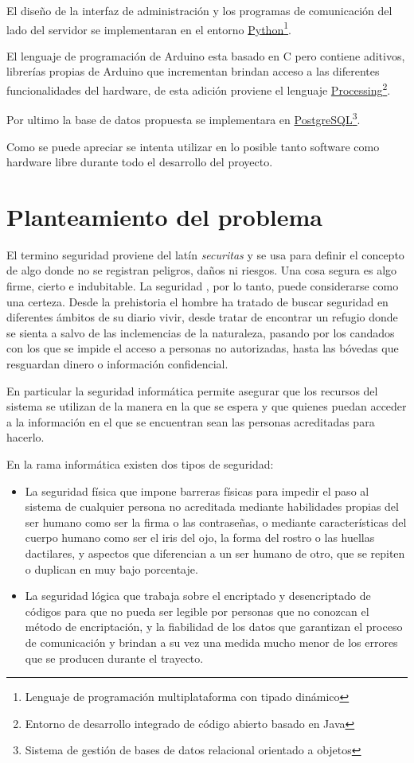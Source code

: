 \documentclass[12pt, letterpaper]{scrartcl}
\begin{document}
	El diseño de la interfaz de administración y los programas de comunicación del lado del servidor se implementaran en el entorno \href{https://www.python.org/}{Python}\footnote{Lenguaje de programación multiplataforma con tipado dinámico}.
	
	El lenguaje de programación de Arduino esta basado en C pero contiene aditivos, librerías propias de Arduino que incrementan brindan acceso a las diferentes funcionalidades del hardware, de esta adición proviene el lenguaje \href{https://processing.org/}{Processing}\footnote{Entorno de desarrollo integrado de código abierto basado en Java}.
	
	Por ultimo la base de datos propuesta se implementara en \href{http://www.postgresql.org/}{PostgreSQL}\footnote{Sistema de gestión de bases de datos relacional orientado a objetos}.
	
	Como se puede apreciar se intenta utilizar en lo posible tanto software como hardware libre durante todo el desarrollo del proyecto.
	
	\section{Planteamiento del problema}
	El termino seguridad proviene del latín \textit{securitas} y se usa para definir el concepto de algo donde no se registran peligros, daños ni riesgos. Una cosa segura es algo firme, cierto e indubitable. La seguridad , por lo tanto, puede considerarse como una certeza. Desde la prehistoria el hombre ha tratado de buscar seguridad en diferentes ámbitos de su diario vivir, desde tratar de encontrar un refugio donde se sienta a salvo de las inclemencias de la naturaleza, pasando por los candados con los que se impide el acceso a personas no autorizadas, hasta las bóvedas que resguardan dinero o información confidencial.
	
	En particular la seguridad informática permite asegurar que los recursos del sistema se utilizan de la manera en la que se espera y que quienes puedan acceder a la información en el que se encuentran sean las personas acreditadas para hacerlo.
	
	En la rama informática existen dos tipos de seguridad:
	\begin{itemize}
		\item La seguridad física que impone barreras físicas para impedir el paso al sistema de cualquier persona no acreditada mediante habilidades propias del ser humano como ser la firma o las contraseñas, o mediante características del cuerpo humano como ser el iris del ojo, la forma del rostro o las huellas dactilares, y aspectos que diferencian a un ser humano de otro, que se repiten o duplican en muy bajo porcentaje.
		\item La seguridad lógica que trabaja sobre el encriptado y desencriptado de códigos para que no pueda ser legible por personas que no conozcan el método de encriptación, y la fiabilidad de los datos que garantizan el proceso de comunicación y brindan a su vez una medida mucho menor de los errores que se producen durante el trayecto.
	\end{itemize}
	
\end{document}
